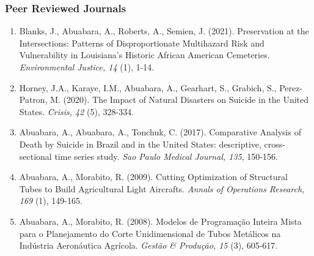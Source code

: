 \documentclass[11pt,oneside]{article}
\begin{document}
\subsubsection{Peer Reviewed Journals}
\begin{enumerate}[leftmargin=40pt]
\item Blanks, J., Abuabara, A., Roberts, A., Semien, J. (2021). Preservation at the Intersections: Patterns of Disproportionate Multihazard Risk and Vulnerability in Louisiana's Historic African American Cemeteries. \emph{Environmental Justice, 14} (1), 1-14.
\item Horney, J.A., Karaye, I.M., Abuabara, A., Gearhart, S., Grabich, S., Perez-Patron, M. (2020). The Impact of Natural Disasters on Suicide in the United States. \emph{Crisis, 42} (5), 328-334.
\item Abuabara, A., Abuabara, A., Tonchuk, C. (2017). Comparative Analysis of Death by Suicide in Brazil and in the United States: descriptive, cross-sectional time series study. \emph{Sao Paulo Medical Journal, 135}, 150-156.
\item Abuabara, A., Morabito, R. (2009). Cutting Optimization of Structural Tubes to Build Agricultural Light Aircrafts. \emph{Annals of Operations Research, 169} (1), 149-165.
\item Abuabara, A., Morabito, R. (2008). Modelos de Programação Inteira Mista para o Planejamento do Corte Unidimensional de Tubos Metálicos na Indústria Aeronáutica Agrícola. \emph{Gestão \& Produção, 15} (3), 605-617.
\end{enumerate}
\end{document}
